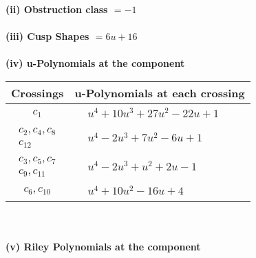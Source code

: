 \documentclass[1p]{elsarticle_modified}
\theoremstyle{definition}
\begin{document}
\flushleft \textbf{(ii) Obstruction class $= -1$}\\~\\
\flushleft \textbf{(iii) Cusp Shapes $= 6 u+16$}\\~\\
\newpage\renewcommand{\arraystretch}{1}
\flushleft \textbf{(iv) u-Polynomials at the component}\newline \\
\begin{tabular}{m{50pt}|m{274pt}}
Crossings & \hspace{64pt}u-Polynomials at each crossing \\
\hline $$\begin{aligned}c_{1}\end{aligned}$$&$\begin{aligned}
&u^4+10 u^3+27 u^2-22 u+1
\end{aligned}$\\
\hline $$\begin{aligned}c_{2},c_{4},c_{8}\\c_{12}\end{aligned}$$&$\begin{aligned}
&u^4-2 u^3+7 u^2-6 u+1
\end{aligned}$\\
\hline $$\begin{aligned}c_{3},c_{5},c_{7}\\c_{9},c_{11}\end{aligned}$$&$\begin{aligned}
&u^4-2 u^3+u^2+2 u-1
\end{aligned}$\\
\hline $$\begin{aligned}c_{6},c_{10}\end{aligned}$$&$\begin{aligned}
&u^4+10 u^2-16 u+4
\end{aligned}$\\
\hline
\end{tabular}\\~\\
\newpage\renewcommand{\arraystretch}{1}
\flushleft \textbf{(v) Riley Polynomials at the component}\newline \\
\end{document}
